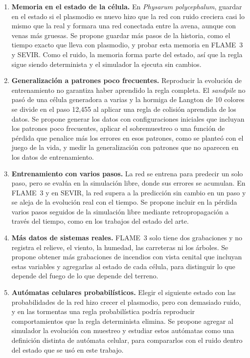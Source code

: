 \begin{enumerate}

	\item \textbf{Memoria en el estado de la célula.} En \textit{Physarum polycephalum}, guardar en el estado si el plasmodio es nuevo hizo que la red con ruido creciera casi lo mismo que la real y formara una red conectada entre la avena, aunque con venas más gruesas. Se propone guardar más pasos de la historia, como el tiempo exacto que lleva con plasmodio, y probar esta memoria en FLAME~3 y SEVIR. Como el ruido, la memoria forma parte del estado, así que la regla sigue siendo determinista y el simulador la ejecuta sin cambios.

	\item \textbf{Generalización a patrones poco frecuentes.} Reproducir la evolución de entrenamiento no garantiza haber aprendido la regla completa. El \textit{sandpile} no pasó de una célula generadora a varias y la hormiga de Langton de 10 colores se divide en el paso 12,455 al aplicar una regla de colisión aprendida de los datos. Se propone generar los datos con configuraciones iniciales que incluyan los patrones poco frecuentes, aplicar el sobremuestreo o una función de pérdida que penalice más los errores en esos patrones, como se planteó con el juego de la vida, y medir la generalización con patrones que no aparecen en los datos de entrenamiento.

	\item \textbf{Entrenamiento con varios pasos.} La red se entrena para predecir un solo paso, pero se evalúa en la simulación libre, donde sus errores se acumulan. En FLAME~3 y en SEVIR, la red supera a la predicción sin cambio en un paso y se aleja de la evolución real con el tiempo. Se propone incluir en la pérdida varios pasos seguidos de la simulación libre mediante retropropagación a través del tiempo, como en los trabajos del estado del arte.

	\item \textbf{Más datos de sistemas reales.} FLAME~3 solo tiene dos grabaciones y no registra el relieve, el viento, la humedad, las carreteras ni los árboles. Se propone obtener más grabaciones de incendios con vista cenital que incluyan estas variables y agregarlas al estado de cada célula, para distinguir lo que depende del fuego de lo que depende del terreno.

	\item \textbf{Autómatas celulares probabilísticos.} Elegir el siguiente estado con las probabilidades de la red hizo crecer el plasmodio, pero con demasiado ruido, y en las tormentas una regla probabilística podría reproducir comportamientos que la regla determinista elimina. Se propone agregar al simulador la evolución con muestreo y estudiar estos autómatas como una definición distinta de autómata celular, para compararlos con el ruido dentro del estado que se usó en este trabajo.


\end{enumerate}
